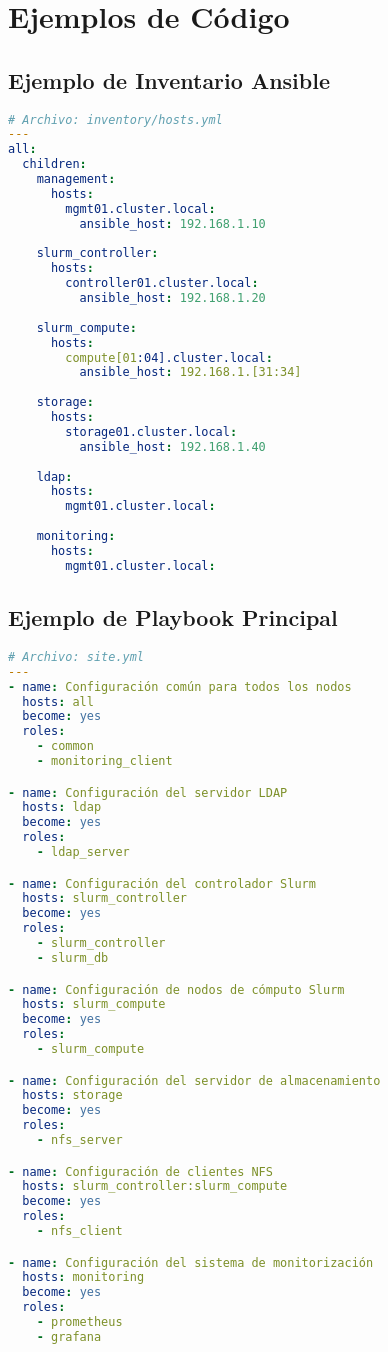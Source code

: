 \documentclass[12pt,a4paper]{report}
\begin{document}
\chapter{Ejemplos de Código}

\section{Ejemplo de Inventario Ansible}

\begin{lstlisting}[language=yaml, caption=Inventario de Ansible para el clúster HPC]
# Archivo: inventory/hosts.yml
---
all:
  children:
    management:
      hosts:
        mgmt01.cluster.local:
          ansible_host: 192.168.1.10
    
    slurm_controller:
      hosts:
        controller01.cluster.local:
          ansible_host: 192.168.1.20
    
    slurm_compute:
      hosts:
        compute[01:04].cluster.local:
          ansible_host: 192.168.1.[31:34]
    
    storage:
      hosts:
        storage01.cluster.local:
          ansible_host: 192.168.1.40
    
    ldap:
      hosts:
        mgmt01.cluster.local:
    
    monitoring:
      hosts:
        mgmt01.cluster.local:
\end{lstlisting}

\section{Ejemplo de Playbook Principal}

\begin{lstlisting}[language=yaml, caption=Playbook principal para el despliegue del clúster]
# Archivo: site.yml
---
- name: Configuración común para todos los nodos
  hosts: all
  become: yes
  roles:
    - common
    - monitoring_client

- name: Configuración del servidor LDAP
  hosts: ldap
  become: yes
  roles:
    - ldap_server

- name: Configuración del controlador Slurm
  hosts: slurm_controller
  become: yes
  roles:
    - slurm_controller
    - slurm_db

- name: Configuración de nodos de cómputo Slurm
  hosts: slurm_compute
  become: yes
  roles:
    - slurm_compute

- name: Configuración del servidor de almacenamiento
  hosts: storage
  become: yes
  roles:
    - nfs_server

- name: Configuración de clientes NFS
  hosts: slurm_controller:slurm_compute
  become: yes
  roles:
    - nfs_client

- name: Configuración del sistema de monitorización
  hosts: monitoring
  become: yes
  roles:
    - prometheus
    - grafana
\end{lstlisting}
\end{document}
